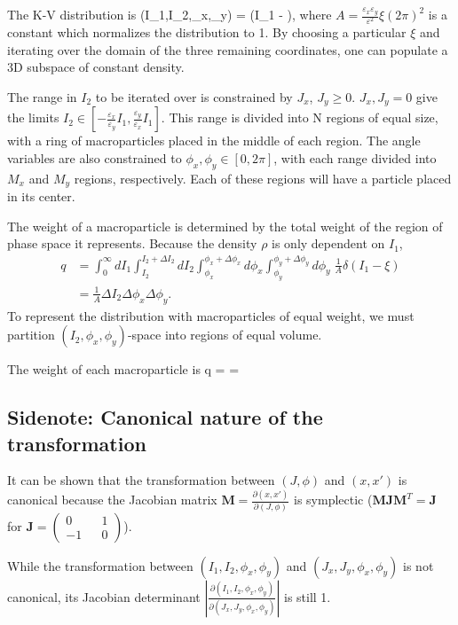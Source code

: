 The K-V distribution is
\Begineq
	\rho(I_1,I_2,\phi_x,\phi_y) =  \delta(I_1 - \xi),
\Endeq
where $A = \frac{\varepsilon_x \varepsilon_y}{\varepsilon^2} \xi (2\pi)^2$ is a constant which normalizes the distribution to 1.  By choosing a particular $\xi$ and iterating over the domain of the three remaining coordinates, one can populate a 3D subspace of constant density.

The range in $I_2$ to be iterated over is constrained by $J_x$, $J_y \geq 0$.  $J_x, J_y = 0$ give the limits $I_2 \in [-\frac{\varepsilon_x}{\varepsilon_y} I_1, \frac{\varepsilon_y}{\varepsilon_x} I_1]$.  This range is divided into N regions of equal size, with a ring of macroparticles placed in the middle of each region.  The angle variables are also constrained to $\phi_x, \phi_y \in [0, 2\pi]$, with each range divided into $M_x$ and $M_y$ regions, respectively.  Each of these regions will have a particle placed in its center.

The weight of a macroparticle is determined by the total weight of the region of phase space it represents.  Because the density $\rho$ is only dependent on $I_1$,
\begin{align}
	q & = \int_{0}^{\infty} dI_1 \int_{I_2}^{I_2 + \Delta I_2} dI_2 \int_{\phi_x}^{\phi_x + \Delta \phi_x} d\phi_x \int_{\phi_y}^{\phi_y + \Delta \phi_y} d\phi_y \; \frac{1}{A} \delta(I_1 - \xi) \\
	  & = \frac{1}{A} \Delta I_2 \Delta \phi_x \Delta \phi_y.
\end{align}
To represent the distribution with macroparticles of equal weight, we must partition $(I_2,\phi_x,\phi_y)$-space into regions of equal volume.

The weight of each macroparticle is
\Begineq
	q =  = 
\Endeq


\subsection{Sidenote: Canonical nature of the transformation}
It can be shown that the transformation between $(J,\phi)$ and $(x,x')$ is canonical because the Jacobian matrix $\mathbf{M} = \frac{\partial(x,x')}{\partial(J,\phi)}$ is symplectic ($\mathbf{M}\mathbf{J}\mathbf{M}^T = \mathbf{J}$ for $\mathbf{J} = (\begin{smallmatrix} 0 && 1 \\ -1 && 0 \end{smallmatrix})$).

While the transformation between $(I_1,I_2,\phi_x,\phi_y)$ and $(J_x,J_y,\phi_x,\phi_y)$ is not canonical, its Jacobian determinant $\left\vert\frac{\partial(I_1,I_2,\phi_x,\phi_y)}{\partial(J_x,J_y,\phi_x,\phi_y)}\right\vert$ is still 1.

